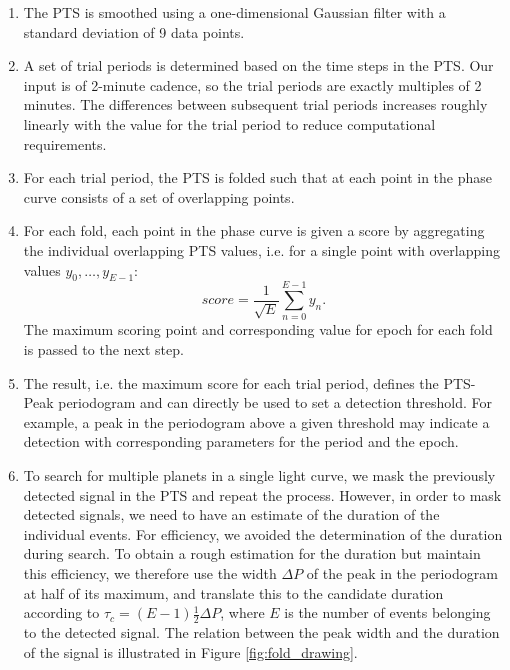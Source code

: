 \begin{enumerate}
    \item The PTS is smoothed using a one-dimensional Gaussian filter with a standard deviation of 9 data points.
    \item A set of trial periods is determined based on the time steps in the PTS. Our input is of 2-minute cadence, so the trial periods are exactly multiples of 2 minutes. The differences between subsequent trial periods increases roughly linearly with the value for the trial period to reduce computational requirements.
    \item For each trial period, the PTS is folded such that at each point in the phase curve consists of a set of overlapping points. 
    \item For each fold, each point in the phase curve is given a score by aggregating the individual overlapping PTS values, i.e. for a single point with overlapping values $y_0,\dots,y_{E-1}$:
    \begin{equation}
        score = \frac{1}{\sqrt{E}} \sum_{n=0}^{E-1}y_n.
    \end{equation}
    The maximum scoring point and corresponding value for epoch for each fold is passed to the next step. 
    \item The result, i.e. the maximum score for each trial period, defines the PTS-Peak periodogram and can directly be used to set a detection threshold. For example, a peak in the periodogram above a given threshold may indicate a detection with corresponding parameters for the period and the epoch.
    \item To search for multiple planets in a single light curve, we mask the previously detected signal in the PTS and repeat the process. However, in order to mask detected signals, we need to have an estimate of the duration of the individual events. For efficiency, we avoided the determination of the duration during search. To obtain a rough estimation for the duration but maintain this efficiency, we therefore use the width $\Delta P$ of the peak in the periodogram at half of its maximum, and translate this to the candidate duration according to $\tau_c = (E-1)\frac{1}{2}\Delta P$, where $E$ is the number of events belonging to the detected signal. The relation between the peak width and the duration of the signal is illustrated in Figure \ref{fig:fold_drawing}.
    
    
\end{enumerate}



